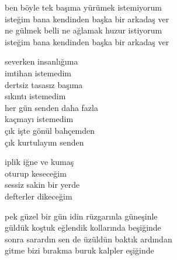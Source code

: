 \documentclass[10pt, openright, oneside]{memoir}
\theoremstyle{definition}
\begin{document}
%
\newpage
{}
\vspace*{\fill}
\settowidth{\versewidth}{isteğim bana kendinden başka bir arkadaş ver}
\begin{cverse}
  ben böyle tek başıma yürümek istemiyorum \\
  isteğim bana kendinden başka bir arkadaş ver \\
  ne gülmek belli ne ağlamak huzur istiyorum \\
  isteğim bana kendinden başka bir arkadaş ver
\end{cverse}
\vspace*{\fill}
%
\newpage
{}
\vspace*{\fill}
\settowidth{\versewidth}{her gün senden daha fazla}
\begin{cverse}
  severken insanlığıma \\
  imtihan istemedim \\
  dertsiz tasasız başıma \\
  sıkıntı istemedim \\
  her gün senden daha fazla \\
  kaçmayı istemedim \\
  çık işte gönül bahçemden \\
  çık kurtulayım senden
\end{cverse}
\vspace*{\fill}
%
\newpage
{}
\vspace*{\fill}
\settowidth{\versewidth}{sessiz sakin bir yerde}
\begin{cverse}
  iplik iğne ve kumaş \\
  oturup keseceğim \\
  sessiz sakin bir yerde \\
  defterler dikeceğim
\end{cverse}
\vspace*{\fill}
%
\newpage
{}
\vspace*{\fill}
\settowidth{\versewidth}{sonra sarardın sen de üzüldün baktık ardından}
\begin{cverse}
  pek güzel bir gün idin rüzgarınla güneşinle \\
  güldük koştuk eğlendik kollarında beşiğinde \\
  sonra sarardın sen de üzüldün baktık ardından \\
  gitme bizi bırakma buruk kalpler eşiğinde
\end{cverse}
\end{document}
